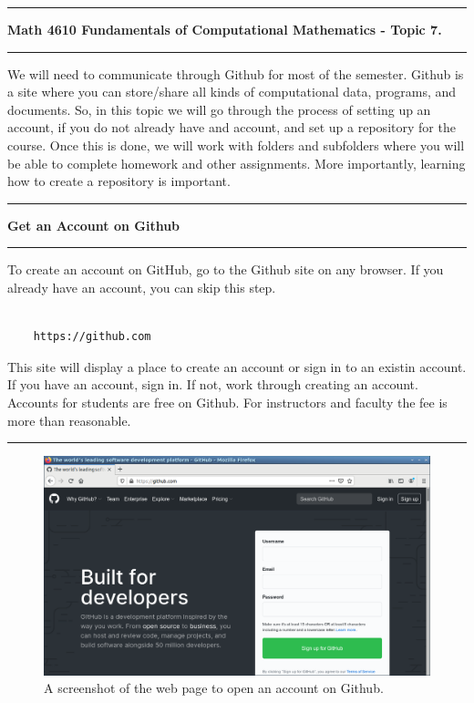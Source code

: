 \documentclass[10pt,fleqn]{article}
\begin{document}
\vskip0.1in\hrule\vskip0.1in \noindent
{\bf Math 4610 Fundamentals of Computational Mathematics  - Topic 7.}
\vskip0.1in\hrule\vskip0.1in \noindent
We will need to communicate through Github for most of the semester. Github is
a site where you can store/share all kinds of computational data, programs, and
documents. So, in this topic we will go through the process of setting up an
account, if you do not already have and account, and set up a repository for the
course. Once this is done, we will work with folders and subfolders where you
will be able to complete homework and other assignments. More importantly, 
learning how to create a repository is important.
\vskip0.1in\hrule\vskip0.1in\noindent
\noindent
{\bf Get an Account on Github} 
\vskip0.1in\hrule\vskip0.1in\noindent
To create an account on GitHub, go to the Github site on any browser. If you
already have an account, you can skip this step.
\begin{verbatim}

    https://github.com

\end{verbatim}
This site will display a place to create an account or sign in to an existin
account. If you have an account, sign in. If not, work through creating an
account. Accounts for students are free on Github. For instructors and faculty
the fee is more than reasonable.
\vskip0.1in\hrule\vskip0.1in
\vfill
\begin{figure}[h]
\centering
\includegraphics[width=5.0in]{../images/github_01.png}
\vskip0.1in
\caption{A screenshot of the web page to open an account on Github.}
\end{figure}
\end{document}
